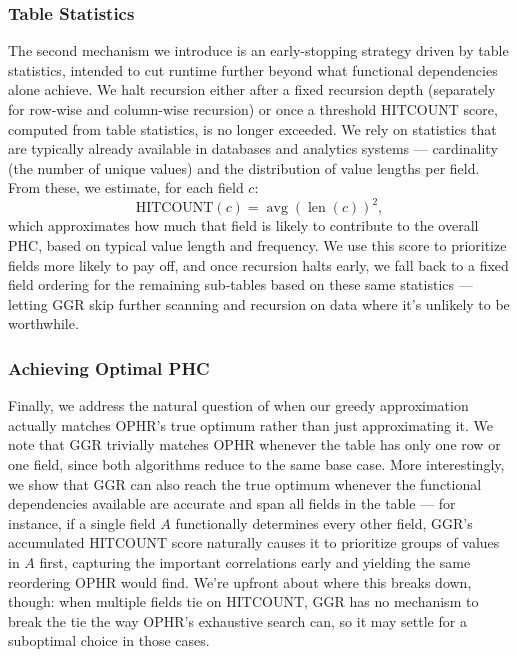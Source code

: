 \documentclass[manuscript,review]{acmart}
\begin{document}
\subsubsection{Table Statistics}
\label{Table Stats}
The second mechanism we introduce is an early-stopping strategy driven by table statistics, intended to cut runtime further beyond what functional dependencies alone achieve. We halt recursion either after a fixed recursion depth (separately for row-wise and column-wise recursion) or once a threshold $\text{HITCOUNT}$ score, computed from table statistics, is no longer exceeded. We rely on statistics that are typically already available in databases and analytics systems — cardinality (the number of unique values) and the distribution of value lengths per field. From these, we estimate, for each field $c$:
\[
\text{HITCOUNT}(c) = \operatorname{avg}(\operatorname{len}(c))^2,
\]
which approximates how much that field is likely to contribute to the overall PHC, based on typical value length and frequency. We use this score to prioritize fields more likely to pay off, and once recursion halts early, we fall back to a fixed field ordering for the remaining sub-tables based on these same statistics — letting GGR skip further scanning and recursion on data where it's unlikely to be worthwhile.
\subsubsection{Achieving Optimal PHC}
\label{Optimal PHC}
Finally, we address the natural question of when our greedy approximation actually matches OPHR's true optimum rather than just approximating it. We note that GGR trivially matches OPHR whenever the table has only one row or one field, since both algorithms reduce to the same base case. More interestingly, we show that GGR can also reach the true optimum whenever the functional dependencies available are accurate and span all fields in the table — for instance, if a single field $A$ functionally determines every other field, GGR's accumulated $\text{HITCOUNT}$ score naturally causes it to prioritize groups of values in $A$ first, capturing the important correlations early and yielding the same reordering OPHR would find. We're upfront about where this breaks down, though: when multiple fields tie on $\text{HITCOUNT}$, GGR has no mechanism to break the tie the way OPHR's exhaustive search can, so it may settle for a suboptimal choice in those cases. 
\end{document}
